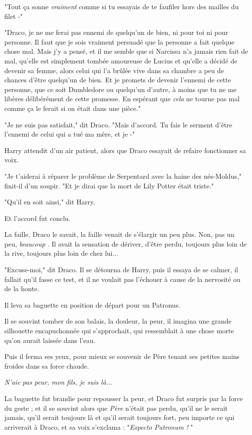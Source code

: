 "Tout ça sonne \emph{vraiment}  comme si tu essayais de te faufiler hors des mailles du filet -"

"Draco, je ne me ferai pas ennemi de quelqu'un de bien, ni pour toi ni pour personne. Il faut que je sois vraiment persuadé que la personne a fait quelque chose mal. Mais j'y a pensé, et il me semble que si Narcissa n'a jamais rien fait de mal, qu'elle est simplement tombée amoureuse de Lucius et qu'elle a décidé de devenir sa femme, alors celui qui l'a brûlée vive dans sa chambre a peu de chances d'être quelqu'un de bien. Et je promets de devenir l'ennemi de cette personne, que ce soit Dumbledore ou quelqu'un d'autre, à moins que tu ne me libères délibérément de cette promesse. En espérant que \emph{cela}  ne tourne pas mal comme ça le ferait si on était dans une pièce."

"Je ne suis pas satisfait," dit Draco. "Mais d'accord. Tu fais le serment d'être l'ennemi de celui qui a tué ma mère, et je -"

Harry attendit d'un air patient, alors que Draco essayait de refaire fonctionner sa voix.

"Je t'aiderai à réparer le problème de Serpentard avec la haine des nés-Moldus," finit-il d'un soupir. "Et je dirai que la mort de Lily Potter était triste."

"Qu'il en soit ainsi," dit Harry.

Et l'accord fut conclu.

La faille, Draco le savait, la faille venait de s'élargir un peu plus. Non, pas un peu, \emph{beaucoup} . Il avait la sensation de dériver, d'être perdu, toujours plus loin de la rive, toujours plus loin de chez lui...

"Excuse-moi," dit Draco. Il se détourna de Harry, puis il essaya de se calmer, il fallait qu'il fasse ce test, et il ne voulait pas l'échouer à cause de la nervosité ou de la honte.

Il leva sa baguette en position de départ pour un Patronus.

Il se souvint tomber de son balais, la douleur, la peur, il imagina une grande silhouette encapuchonnée qui s'approchait, qui ressemblait à une chose morte qu'on aurait laissée dans l'eau.

Puis il ferma ses yeux, pour mieux se souvenir de Père tenant ses petites mains froides dans sa force chaude.

\emph{N'aie pas peur, mon fils, je suis là...} 

La baguette fut brandie pour repousser la peur, et Draco fut surpris par la force du geste ; et il se souvint alors que \emph{Père}  n'était pas perdu, qu'il ne le serait jamais, qu'il serait toujours là et qu'il serait toujours fort, peu importe ce qui arriverait à Draco, et sa voix s'exclama : "\emph{Expecto Patronum !} "

